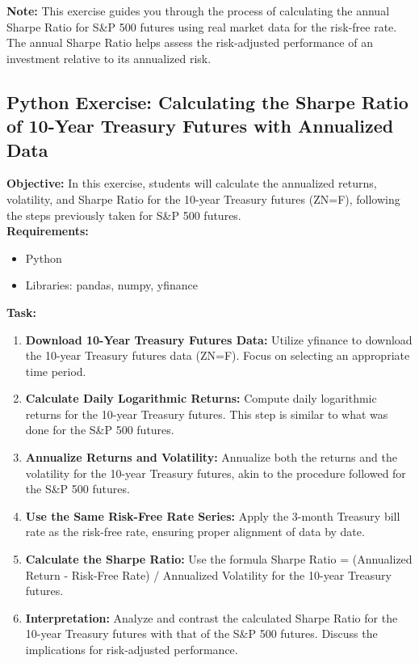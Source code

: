\documentclass{article}
\begin{document}
\textbf{Note:} This exercise guides you through the process of calculating the annual Sharpe Ratio for S\&P 500 futures using real market data for the risk-free rate. The annual Sharpe Ratio helps assess the risk-adjusted performance of an investment relative to its annualized risk.

\subsection{Python Exercise: Calculating the Sharpe Ratio of 10-Year Treasury Futures with Annualized Data}

\textbf{Objective:} In this exercise, students will calculate the annualized returns, volatility, and Sharpe Ratio for the 10-year Treasury futures (ZN=F), following the steps previously taken for S\&P 500 futures. \\

\textbf{Requirements:}
\begin{itemize}
    \item Python
    \item Libraries: pandas, numpy, yfinance
\end{itemize}

\textbf{Task:}
\begin{enumerate}
    \item \textbf{Download 10-Year Treasury Futures Data:} Utilize yfinance to download the 10-year Treasury futures data (ZN=F). Focus on selecting an appropriate time period.
    
    \item \textbf{Calculate Daily Logarithmic Returns:} Compute daily logarithmic returns for the 10-year Treasury futures. This step is similar to what was done for the S\&P 500 futures.
    
    \item \textbf{Annualize Returns and Volatility:} Annualize both the returns and the volatility for the 10-year Treasury futures, akin to the procedure followed for the S\&P 500 futures.
    
    \item \textbf{Use the Same Risk-Free Rate Series:} Apply the 3-month Treasury bill rate as the risk-free rate, ensuring proper alignment of data by date.
    
    \item \textbf{Calculate the Sharpe Ratio:} Use the formula Sharpe Ratio = (Annualized Return - Risk-Free Rate) / Annualized Volatility for the 10-year Treasury futures.
    
    \item \textbf{Interpretation:} Analyze and contrast the calculated Sharpe Ratio for the 10-year Treasury futures with that of the S\&P 500 futures. Discuss the implications for risk-adjusted performance.
\end{enumerate}
\end{document}
